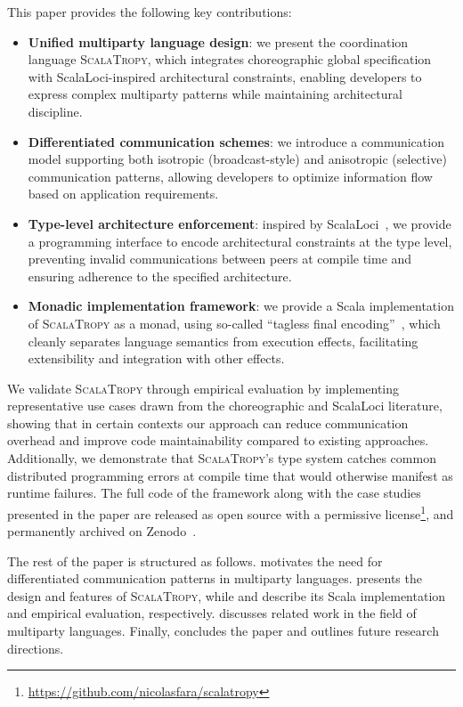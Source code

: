 \documentclass[runningheads]{llncs}
\newcommand{\ourLang}{\textsc{ScalaTropy}}
\newcommand{\diff}[1]{{#1}}
\begin{document}
This paper provides the following key contributions:
\begin{itemize}
    \item \textbf{Unified multiparty language design}: we present the coordination language \ourLang{}, which integrates choreographic global specification with \diff{ScalaLoci-inspired} architectural constraints, enabling developers to express complex multiparty patterns while maintaining architectural discipline.
    \item \textbf{Differentiated communication schemes}: we introduce a communication model supporting both isotropic (broadcast-style) and anisotropic (selective) communication patterns, allowing developers to optimize information flow based on application requirements.
    \item \textbf{Type-level architecture enforcement}: inspired by ScalaLoci~\cite{DBLP:journals/pacmpl/WeisenburgerKS18}, we provide a programming interface to encode architectural constraints at the type level, preventing invalid communications between peers at compile time and ensuring adherence to the specified architecture.
    \item \textbf{Monadic implementation framework}: we provide a Scala implementation of \ourLang{} as a monad, using so-called ``tagless final encoding''~\cite{DBLP:journals/jfp/CaretteKS09}, which cleanly separates language semantics from execution effects, facilitating extensibility and integration with other effects.

\end{itemize}
%
We validate \ourLang{} through empirical evaluation by implementing representative use cases \diff{drawn from the choreographic and ScalaLoci literature},
showing that in certain contexts our approach can reduce communication overhead and improve code maintainability compared to existing approaches.
%
Additionally, we demonstrate that \ourLang{}'s type system catches common distributed programming errors at compile time that would otherwise manifest as runtime failures.
%
The full code of the framework along with the case studies presented in the paper are released as open source with a permissive license\footnote{\url{https://github.com/nicolasfara/scalatropy}},
and permanently archived on Zenodo~\cite{nicolas_farabegoli_2026_19407062}.

The rest of the paper is structured as follows.
%
 motivates the need for differentiated communication patterns in multiparty languages.
%
 presents the design and features of \ourLang{}, 
while  and  describe its Scala implementation and empirical evaluation, 
respectively.
%
 discusses related work in the field of multiparty languages.
% 
Finally,
 concludes the paper and outlines future research directions.
\end{document}
